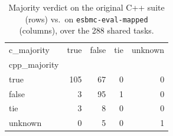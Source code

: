 \begin{table}[t]
  \centering
  \caption{Majority verdict on the original C++ suite (rows) vs.\ on \texttt{esbmc-eval-mapped} (columns), over the 288 shared tasks.}
  \label{tab:dual-majority-esbmc-eval-mapped}
\begin{tabular}{lrrrr}
\toprule
c_majority & true & false & tie & unknown \\
cpp_majority &  &  &  &  \\
\midrule
true & 105 & 67 & 0 & 0 \\
false & 3 & 95 & 1 & 0 \\
tie & 3 & 8 & 0 & 0 \\
unknown & 0 & 5 & 0 & 1 \\
\bottomrule
\end{tabular}
\end{table}
